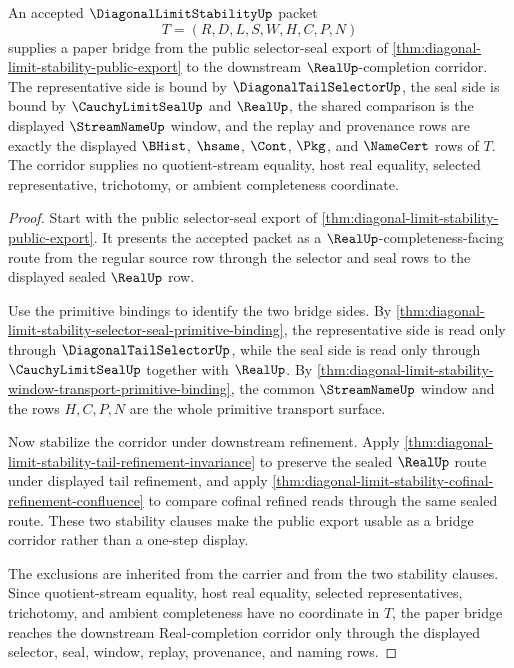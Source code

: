 \begin{theorem}
\label{thm:diagonal-limit-stability-bridge-corridor}
An accepted $\DiagonalLimitStabilityUp$ packet
$$
T=(R,D,L,S,W,H,C,P,N)
$$
supplies a paper bridge from the public selector-seal export of \autoref{thm:diagonal-limit-stability-public-export} to the downstream $\RealUp$-completion corridor. The representative side is bound by $\DiagonalTailSelectorUp$, the seal side is bound by $\CauchyLimitSealUp$ and $\RealUp$, the shared comparison is the displayed $\StreamNameUp$ window, and the replay and provenance rows are exactly the displayed $\BHist$, $\hsame$, $\Cont$, $\Pkg$, and $\NameCert$ rows of $T$. The corridor supplies no quotient-stream equality, host real equality, selected representative, trichotomy, or ambient completeness coordinate.
\end{theorem}
\begin{proof}
Start with the public selector-seal export of \autoref{thm:diagonal-limit-stability-public-export}. It presents the accepted packet as a $\RealUp$-completeness-facing route from the regular source row through the selector and seal rows to the displayed sealed $\RealUp$ row.

Use the primitive bindings to identify the two bridge sides. By \autoref{thm:diagonal-limit-stability-selector-seal-primitive-binding}, the representative side is read only through $\DiagonalTailSelectorUp$, while the seal side is read only through $\CauchyLimitSealUp$ together with $\RealUp$. By \autoref{thm:diagonal-limit-stability-window-transport-primitive-binding}, the common $\StreamNameUp$ window and the rows $H,C,P,N$ are the whole primitive transport surface.

Now stabilize the corridor under downstream refinement. Apply \autoref{thm:diagonal-limit-stability-tail-refinement-invariance} to preserve the sealed $\RealUp$ route under displayed tail refinement, and apply \autoref{thm:diagonal-limit-stability-cofinal-refinement-confluence} to compare cofinal refined reads through the same sealed route. These two stability clauses make the public export usable as a bridge corridor rather than a one-step display.

The exclusions are inherited from the carrier and from the two stability clauses. Since quotient-stream equality, host real equality, selected representatives, trichotomy, and ambient completeness have no coordinate in $T$, the paper bridge reaches the downstream Real-completion corridor only through the displayed selector, seal, window, replay, provenance, and naming rows.
\end{proof}

